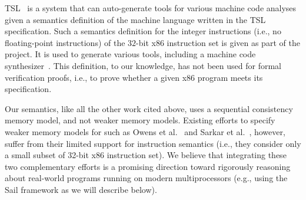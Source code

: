 TSL~\cite{TSL:TOPLAS13} is a system that can auto-generate tools for
various machine code analyses given a semantics definition of the machine
language written in the TSL specification. Such a semantics
definition for the integer instructions (i.e., no floating-point instructions) of the $32$-bit x86 instruction set is given
as part of the project. It is used to generate
various tools, including a machine code synthesizer~\cite{Srinivasan2015}.
This definition, to our knowledge, has not been used
for formal verification proofs, i.e., to prove whether a given x86
program meets its specification.

Our semantics, like all the other work cited above, uses a sequential consistency memory model, and not weaker memory models.
Existing efforts to specify weaker memory models for \ISA such as Owens et al.~\cite{Owens:x86-TSO} and Sarkar et al.~\cite{Sarkar:POPL09}, however, suffer from their limited support for instruction semantics (i.e., they consider only a small subset of 32-bit x86 instruction set).
We believe that integrating these two complementary efforts is a promising direction toward rigorously reasoning about real-world programs running on modern multiprocessors (e.g., using the Sail framework as we will describe below).


